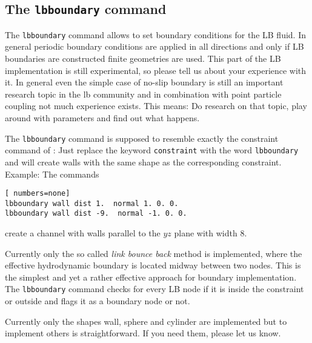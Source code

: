 \subsection*{The \texttt{lbboundary} command}
The \texttt{lbboundary} command allows to set boundary conditions for the LB fluid. In general
periodic boundary conditions are applied in all directions and only if LB boundaries
are constructed finite geometries are used. This part of the LB implementation is still experimental,
so please tell us about your experience with it. In general even the simple case of no-slip
boundary is still an important research topic in the lb community and in combination with
point particle coupling not much experience exists. This means: Do research on that topic, play
around with parameters and find out what happens. 


The \texttt{lbboundary} command is supposed to resemble exactly the constraint command of 
\ES{}: Just replace the keyword \texttt{constraint} with the word \texttt{lbboundary} 
and \ES{} will create walls with the same shape as the corresponding constraint. Example:
The commands
\begin{lstlisting}[ numbers=none]
lbboundary wall dist 1.  normal 1. 0. 0. 
lbboundary wall dist -9.  normal -1. 0. 0. 
\end{lstlisting}
create a channel with walls parallel to the $yz$ plane with width 8.

Currently only the so called \emph{link bounce back} method is implemented, where the effective
hydrodynamic boundary is located midway between two nodes. This is the simplest and yet a 
rather effective approach for boundary implementation. The \texttt{lbboundary} command
checks for every LB node if it is inside the constraint or outside and flags it as a boundary
node or not. 

Currently only the shapes wall, sphere and cylinder are implemented but to implement others 
is straightforward. If you need them, please let us know.
